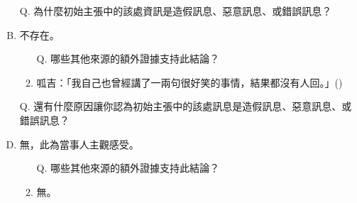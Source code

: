 \documentclass[a4paper, 12pt]{article}
\begin{document}
\begin{enumerate}[I.]
          \begin{enumerate}[A.]
              \item [Q.] 為什麼{\color{blue}初始主張}中的該處資訊是造假訊息、惡意訊息、或錯誤訊息？
              \item 不存在。
                    \begin{enumerate}[1.]
                        \item [Q.] 哪些其他來源的額外證據支持此結論？
                        \item 呱吉：「我自己也曾經講了一兩句很好笑的事情，結果都沒有人回。」(\cite{eFs8bNzDAHg7227s})
                    \end{enumerate}
              \item [Q.] 還有什麼原因讓你認為{\color{blue}初始主張}中的該處訊息是造假訊息、惡意訊息、或錯誤訊息？
              \item 無，此為當事人主觀感受。
                    \begin{enumerate}[1.]
                        \item [Q.] 哪些其他來源的額外證據支持此結論？
                        \item 無。
                    \end{enumerate}
          \end{enumerate}
\end{enumerate}

\printbibliography[title=參考文獻]
\end{document}
